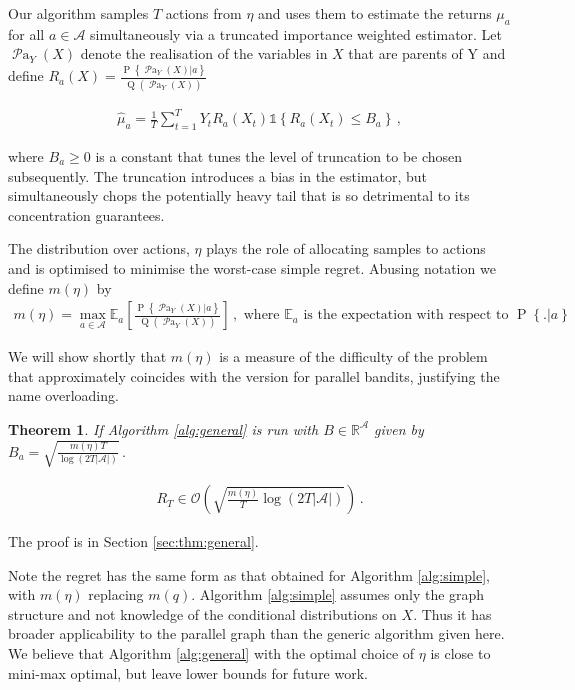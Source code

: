 \documentclass[11pt,a4paper,oneside]{book}
\newcommand{\Q}[1]{\operatorname{Q}\left(#1\right)}
\newcommand{\EE}{\mathbb E}
\newcommand{\EEa}{\EE_a}
\newcommand{\Pn}[2]{\operatorname{P}\left\{#2|#1\right\}}
\newcommand{\calA}{\mathcal A}
\newcommand{\R}{\mathbb R}
\newcommand{\set}[1]{\left\{#1\right\}}
\newcommand{\ind}[1]{\mathds{1}\!\!\set{#1}}
\newcommand{\eq}[1]{\begin{align*}#1\end{align*}}
\newcommand{\bigo}[1]{\mathcal{O}\left( #1 \right)}
\newcommand{\parents}[1]{\operatorname{\mathcal{P}a}_{#1}}
\newcommand{\simpleregret}{R_T}
\theoremstyle{plain}
\newtheorem{theorem}{Theorem}
\theoremstyle{definition}
\begin{document}
Our algorithm samples $T$ actions from $\eta$ and uses them to estimate the returns $\mu_a$ for all $a \in \calA$ simultaneously via a truncated importance weighted estimator. Let $\parents{Y}(X)$ denote the realisation of the variables in $X$ that are parents of Y and define $R_a(X) = \frac{\Pn{a}{\parents{Y}(X)}}{\Q{\parents{Y}(X)}}$

\eq {
\hat \mu_a =  \frac{1}{T} \sum_{t=1}^T Y_t R_a(X_t)  \ind{R_a(X_t) \leq B_a}\,, 
} 

where $ B_a \geq 0$  is a constant that tunes the level of truncation to be chosen subsequently. The truncation introduces a bias in the estimator, but simultaneously chops the potentially heavy tail that is so detrimental to its concentration guarantees. 

The distribution over actions, $\eta$ plays the role of allocating samples to actions and is optimised to minimise the worst-case simple regret. Abusing notation we define $m(\eta)$ by
\eq{
m(\eta) = \max_{a \in \calA} \EEa\left[\frac{\Pn{a}{\parents{Y}(X)}}{\Q{\parents{Y}(X)}}\right]\,,\text{ where } \EEa \text{ is the expectation with respect to } \Pn{a}.
}

We will show shortly that $m(\eta)$ is a measure of the difficulty of the problem that approximately coincides with the version for parallel bandits, justifying the name overloading.

\begin{theorem}\label{thm:general}
If Algorithm \ref{alg:general} is run with $B \in \R^{\calA}$ given by $B_a = \sqrt{\frac{m(\eta)T}{\log\left(2T|\calA|\right)}}\,.$

\eq{
\simpleregret \in \bigo{\sqrt{\frac{m(\eta)}{T} \log\left(2T|\calA|\right)}}\,.
}
\end{theorem}

The proof is in Section \ref{sec:thm:general}.

Note the regret has the same form as that obtained for Algorithm \ref{alg:simple}, with $m(\eta)$ replacing $m(q)$. Algorithm \ref{alg:simple} assumes only the graph structure and not knowledge of the conditional distributions on $X$. Thus it has broader applicability to the parallel graph than the generic algorithm given here. We believe that Algorithm \ref{alg:general} with the optimal choice of $\eta$ is close to mini-max optimal, but leave lower bounds
for future work.
\end{document}
